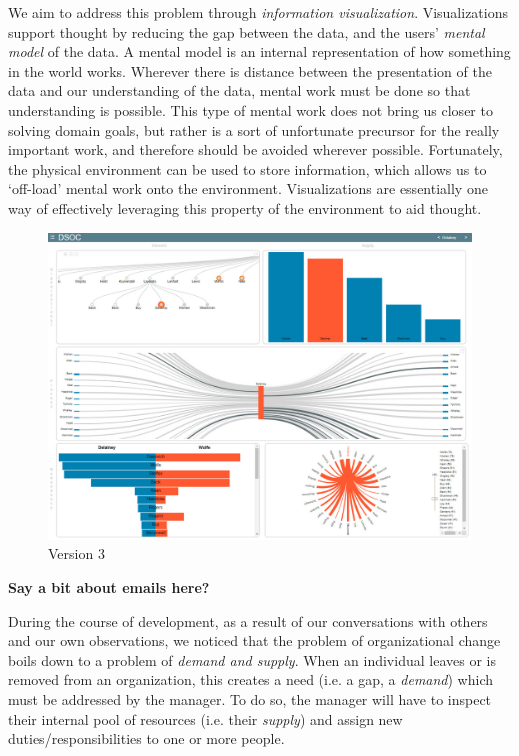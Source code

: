 \message{ !name(FinalPaper.tex)}\documentclass[journal]{vgtc}                %
\begin{document}
We aim to address this problem through \emph{information visualization}. Visualizations support thought by reducing the gap between the data, and the users' \emph{mental model} of the data\cite{yi2007toward}. A mental model is an internal representation of how something in the world works\cite{staggersmodel,norman2014some}. Wherever there is distance between the presentation of the data and our understanding of the data, mental work must be done so that understanding is possible. This type of mental work does not bring us closer to solving domain goals, but rather is a sort of unfortunate precursor for the really important work, and therefore should be avoided wherever possible\cite{paas2003cognitive}. Fortunately, the physical environment can be used to store information, which allows us to \lq off-load\rq{} mental work onto the environment\cite{wilson2002six}. Visualizations are essentially one way of effectively leveraging this property of the environment to aid thought.
\begin{figure}
  \centering
  \includegraphics[width=\columnwidth]{pictures/version3.jpg}
  \caption{Version 3}
  \label{fig:global}
\end{figure}


\textbf{{\color{Plum}Say a bit about emails here?}}

During the course of development, as a result of our conversations with others and our own observations, we noticed that the problem of organizational change boils down to a problem of \emph{demand and supply}. When an individual leaves or is removed from an organization, this creates a need (i.e. a gap, a \emph{demand}) which must be addressed by the manager. To do so, the manager will have to inspect their internal pool of resources (i.e. their \emph{supply}) and assign new duties/responsibilities to one or more people.
\end{document}
